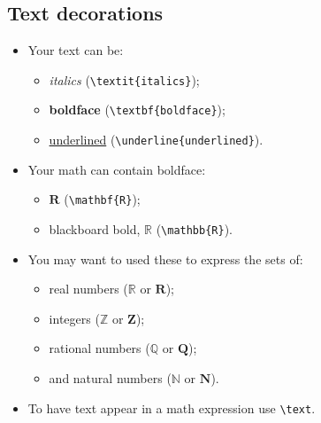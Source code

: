 \documentclass{article} %
\begin{document}
    \subsection{Text decorations}
    \begin{itemize}
        \item Your text can be:
            \begin{itemize}
                \item \textit{italics} (\verb!\textit{italics}!);
                \item \textbf{boldface} (\verb!\textbf{boldface}!);
                \item \underline{underlined} (\verb!\underline{underlined}!).
            \end{itemize}
        
        \item Your math can contain boldface:
            \begin{multicols}{2}
            \begin{itemize}
                \item $\mathbf{R}$ (\verb!\mathbf{R}!);
                \item blackboard bold, $\mathbb{R}$ (\verb!\mathbb{R}!).
            \end{itemize}
            \end{multicols}
       
        \item You may want to used these to express the sets of:
            \begin{multicols}{2}
            \begin{itemize}
                \item real numbers ($\mathbb{R}$ or $\mathbf{R}$);
                \item integers ($\mathbb{Z}$ or $\mathbf{Z}$);
                \item rational numbers ($\mathbb{Q}$ or $\mathbf{Q}$);
                \item and natural numbers ($\mathbb{N}$ or $\mathbf{N}$).
            \end{itemize}
            \end{multicols}
        
        \item To have text appear in a math expression use \verb!\text!.
    \end{itemize}
            
\end{document}
